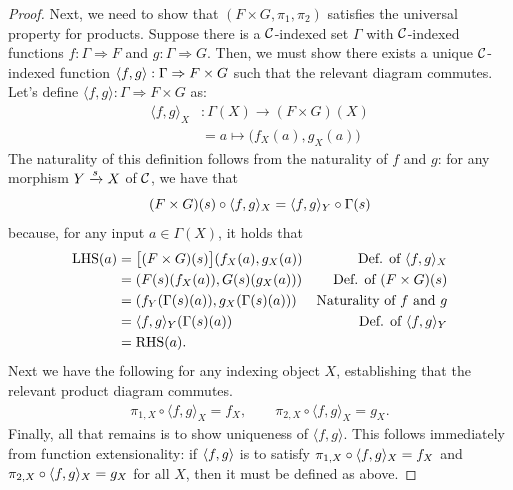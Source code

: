 \begin{proof}
Next, we need to show that $(F \times G, \pi_1, \pi_2)$ satisfies the universal
property for products. Suppose there is a $\mathcal C$-indexed set $\Gamma$ 
with $\mathcal C$-indexed functions $f : \Gamma \Rightarrow F$ and $g : \Gamma \Rightarrow G$.
Then, we must show there exists a unique $\mathcal C$-indexed function $\langle f,g\rangle : \Gamma \Rightarrow
F \times G$ such that the relevant diagram commutes.
Let's define $\langle f, g \rangle : \Gamma \Rightarrow F \times G$ as:
\begin{align*}
  \langle f, g \rangle_X &: \Gamma(X) \to (F \times G)(X) \\ 
  &= a \mapsto \Big(f_X(a), g_X(a)\Big)
\end{align*}
The naturality of this definition follows from the naturality of \(f\) and \(g\):
for any morphism \(Y \xrightarrow{s} X\) of \(\mathcal C\),
we have that
\[
(F\times G)(s) \circ \langle f,g\rangle_X
=
\langle f,g\rangle_Y \circ \Gamma(s)
\]
because, for any input \(a \in \Gamma(X)\), it holds that
\begin{align*}
  \text{LHS}(a)
  &= \big[(F \times G)(s)\big](f_X(a),g_X(a)) & \text{Def. of \(\langle f,g\rangle_X\)} \\
  &= (F(s)(f_X(a)),G(s)(g_X(a))) & \text{Def. of \((F \times G)(s)\)} \\
  &= (f_Y(\Gamma(s)(a)),g_X(\Gamma(s)(a))) & \text{Naturality of \(f\) and \(g\)} \\
  &= \langle f,g\rangle_Y(\Gamma(s)(a)) & \text{Def. of \(\langle f,g\rangle_Y\)} \\
  &= \text{RHS}(a).
\end{align*}
Next we have the following for any indexing object $X$, establishing that the relevant product diagram commutes.
\begin{align*}
  \pi_{1,X} \circ \langle f, g \rangle_X = f_X, 
  \qquad
  \pi_{2,X} \circ \langle f, g \rangle_X = g_X.
\end{align*}
Finally, all that remains is to show uniqueness of $\langle f, g \rangle$.
This follows immediately from function extensionality:
if \(\langle f,g\rangle\) is to satisfy \(\pi_{1,X} \circ \langle f,g\rangle_X = f_X\)
and \(\pi_{2,X} \circ \langle f,g\rangle_X = g_X\) for all \(X\),
then it must be defined as above.
\end{proof}







